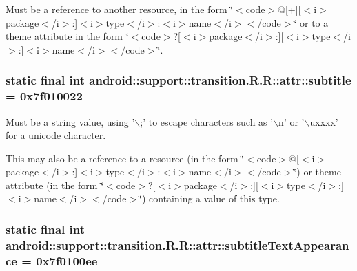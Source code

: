 Must be a reference to another resource, in the form \char`\"{}$<$code$>$@\mbox{[}+\mbox{]}\mbox{[}$<$i$>$package$<$/i$>$:\mbox{]}$<$i$>$type$<$/i$>$:$<$i$>$name$<$/i$>$$<$/code$>$\char`\"{} or to a theme attribute in the form \char`\"{}$<$code$>$?\mbox{[}$<$i$>$package$<$/i$>$:\mbox{]}\mbox{[}$<$i$>$type$<$/i$>$:\mbox{]}$<$i$>$name$<$/i$>$$<$/code$>$\char`\"{}. \hypertarget{classandroid_1_1support_1_1transition_1_1_r_1_1attr_0e09b55627bee2eac21ec2200af66654}{
\subsubsection[{subtitle}]{\setlength{\rightskip}{0pt plus 5cm}static final int android::support::transition.R.R::attr::subtitle = 0x7f010022}}
\label{classandroid_1_1support_1_1transition_1_1_r_1_1attr_0e09b55627bee2eac21ec2200af66654}


Must be a \hyperlink{classandroid_1_1support_1_1transition_1_1_r_1_1string}{string} value, using '$\backslash$;' to escape characters such as '$\backslash$n' or '$\backslash$uxxxx' for a unicode character. 

This may also be a reference to a resource (in the form \char`\"{}$<$code$>$@\mbox{[}$<$i$>$package$<$/i$>$:\mbox{]}$<$i$>$type$<$/i$>$:$<$i$>$name$<$/i$>$$<$/code$>$\char`\"{}) or theme attribute (in the form \char`\"{}$<$code$>$?\mbox{[}$<$i$>$package$<$/i$>$:\mbox{]}\mbox{[}$<$i$>$type$<$/i$>$:\mbox{]}$<$i$>$name$<$/i$>$$<$/code$>$\char`\"{}) containing a value of this type. \hypertarget{classandroid_1_1support_1_1transition_1_1_r_1_1attr_37e5683975ee0c8a69f591add68aba19}{
\subsubsection[{subtitleTextAppearance}]{\setlength{\rightskip}{0pt plus 5cm}static final int android::support::transition.R.R::attr::subtitleTextAppearance = 0x7f0100ee}}
\label{classandroid_1_1support_1_1transition_1_1_r_1_1attr_37e5683975ee0c8a69f591add68aba19}


